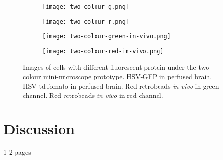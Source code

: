 \begin{figure}[h]
    \begin{subfigure}[t]{.5\linewidth}
        \texttt{[image: two-colour-g.png]}
        \caption{\label{f.twocolour.g}}
    \end{subfigure}
    \begin{subfigure}[t]{.5\linewidth}
        \texttt{[image: two-colour-r.png]}
        \caption{\label{f.twocolour.r}}
    \end{subfigure}
    \begin{subfigure}[t]{.5\linewidth}
        \texttt{[image: two-colour-green-in-vivo.png]}
        \caption{\label{f.twocolour.g.invivo}}
    \end{subfigure}
    \begin{subfigure}[t]{.5\linewidth}
        \texttt{[image: two-colour-red-in-vivo.png]}
        \caption{\label{f.twocolour.r.invivo}}
    \end{subfigure}

    \caption{Images of cells with different fluorescent protein under the two-colour mini-microscope prototype.  HSV-GFP in perfused brain.  HSV-tdTomato in perfused brain.  Red retrobeads \textit{in vivo} in green channel.  Red retrobeads \textit{in vivo} in red channel. \label{f.twocolour}}
\end{figure}

















\begin{comment}
\begin{figure}[h]
    \texttt{[image: behaviour-schematic.png]}
    \caption{Proposed experiment. A mixture of GCaMP6s-expressing AAV and tdTomato-expressing long-term HSV are infused into LA of the animals. A two-colour microscope is implanted to visualize infected LA neurons. The animal then subject to auditory fear conditioning paradigm, and GCaMP6s signals in either tdTomato\textsuperscript{+} or tdTomato\textsuperscript{-} cells are recorded. We hypothesize that the tdTomato\textsuperscript{+} cells will be more excitable than tdTomato\textsuperscript{-} cells during training and testing. \label{f.behaviour-schema}}
\end{figure}
\end{comment}




\section{Discussion}
1-2 pages
